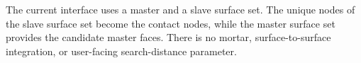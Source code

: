 \begin{warningbox}
The current  interface uses a master and a slave surface set. The unique nodes of the slave surface set become the contact nodes, while the master surface set provides the candidate master faces. There is no mortar, surface-to-surface integration, or user-facing search-distance parameter.
\end{warningbox}
